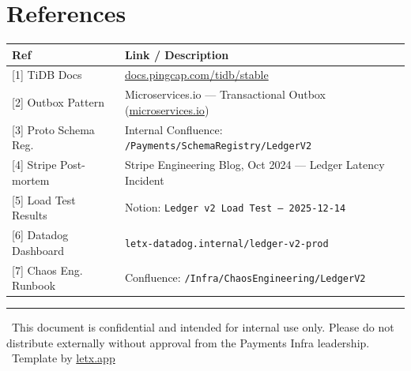 \section{References}

\begin{tabularx}{\linewidth}{@{}K@{\hspace{8mm}}V@{}}
\toprule
Ref & Link / Description \\
\midrule
{}[1] TiDB Docs & \href{https://docs.pingcap.com/tidb/stable}{docs.pingcap.com/tidb/stable} \\
{}[2] Outbox Pattern & Microservices.io — Transactional Outbox (\href{https://microservices.io/patterns/data/transactional-outbox.html}{microservices.io}) \\
{}[3] Proto Schema Reg. & Internal Confluence: \texttt{/Payments/SchemaRegistry/LedgerV2} \\
{}[4] Stripe Post-mortem & Stripe Engineering Blog, Oct 2024 — Ledger Latency Incident \\
{}[5] Load Test Results & Notion: \texttt{Ledger v2 Load Test — 2025-12-14} \\
{}[6] Datadog Dashboard & \texttt{letx-datadog.internal/ledger-v2-prod} \\
{}[7] Chaos Eng. Runbook & Confluence: \texttt{/Infra/ChaosEngineering/LedgerV2} \\
\bottomrule
\end{tabularx}

\vspace{12pt}
\color{rulecolor}\rule{\linewidth}{0.6pt}
\vspace{4pt}

{\footnotesize\color{muted}
\faLock\ This document is confidential and intended for internal use only.
Please do not distribute externally without approval from the Payments Infra leadership.
\hfill
\faEdit\ Template by \href{https://letx.app}{letx.app}
}
